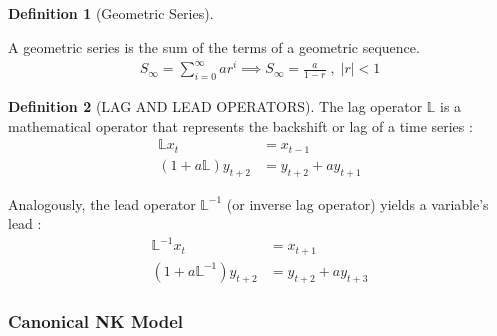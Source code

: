 \documentclass[
	12pt,
	]{article}
\numberwithin{equation}{section}
\theoremstyle{definition}
\newtheorem{definition}{Definition}[section]
\theoremstyle{plain}
\theoremstyle{plain}
\theoremstyle{plain}
\begin{document}

\begin{definition}[Geometric Series]\label{def:geometric-series}
	
	A geometric series is the sum of the terms of a geometric sequence.
	\begin{align*}
		S_\infty = \sum_{i=0}^{\infty} ar^i \implies 
		S_\infty = \frac{a}{1-r} \; , \; |r| <1
	\end{align*}
	
\end{definition}


\begin{definition}[LAG AND LEAD OPERATORS]\label{def:lag-operator}
	The lag operator $\mathbb{L}$ is a mathematical operator that represents the backshift or lag of a time series \cite[Lecture 13, p.9]{solis-garcia_ucb_2022}:
	\begin{align*}
		\mathbb{L} x_t            & = x_{t-1}              \\
		(1 + a\mathbb{L})y_{t+2} & = y_{t+2} + ay_{t+1}
	\end{align*}
	
	Analogously, the lead operator $\mathbb{L}^{-1}$ (or inverse lag operator) yields a variable's lead \cite[Lecture 13, p.9]{solis-garcia_ucb_2022}:
	\begin{align*}
		\mathbb{L}^{-1} x_t            & = x_{t+1}              \\
		(1 + a\mathbb{L}^{-1})y_{t+2} & = y_{t+2} + ay_{t+3}
	\end{align*}
\end{definition}

\subsubsection{Canonical NK Model}

\end{document}

